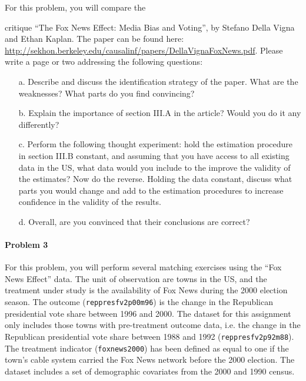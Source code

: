 \documentclass{article}
\begin{document}
For this problem, you will compare the 

critique ``The Fox News Effect: Media Bias
and Voting'', by Stefano Della Vigna and Ethan Kaplan. The paper can
be found here:
\url{http://sekhon.berkeley.edu/causalinf/papers/DellaVignaFoxNews.pdf}. Please
write a page or two addressing the following questions:

   \begin{itemize}
   \item[a.]  Describe and discuss the identification strategy of the
     paper. What are the weaknesses? What parts do you find
     convincing?
   \item[b.] Explain the importance of section III.A in the article?
     Would you do it any differently?
   \item[c.] Perform the following thought experiment: hold the
     estimation procedure in section III.B constant, and assuming that
     you have access to all existing data in the US, what data would
     you include to the improve the validity of the estimates? Now do
     the reverse. Holding the data constant, discuss what parts you
     would change and add to the estimation procedures to increase
     confidence in the validity of the results.
   \item[d.] Overall, are you convinced that their conclusions are
     correct?
\end{itemize}




\paragraph{Problem 3} 

For this problem, you will perform several matching exercises using
the ``Fox News Effect'' data.  The unit of observation are towns in
the US, and the treatment under study is the availability of Fox News
during the 2000 election season. The outcome (\texttt{reppresfv2p00m96}) is the
change in the Republican presidential vote share between 1996 and
2000. The dataset for this assignment only includes those towns with
pre-treatment outcome data, i.e. the change in the Republican
presidential vote share between 1988 and 1992 (\texttt{reppresfv2p92m88}). The
treatment indicator (\texttt{foxnews2000}) has been defined as equal to one if
the town’s cable system carried the Fox News network before the 2000
election. The dataset includes a set of demographic covariates from
the 2000 and 1990 census.
\vspace{1em}
\end{document}
